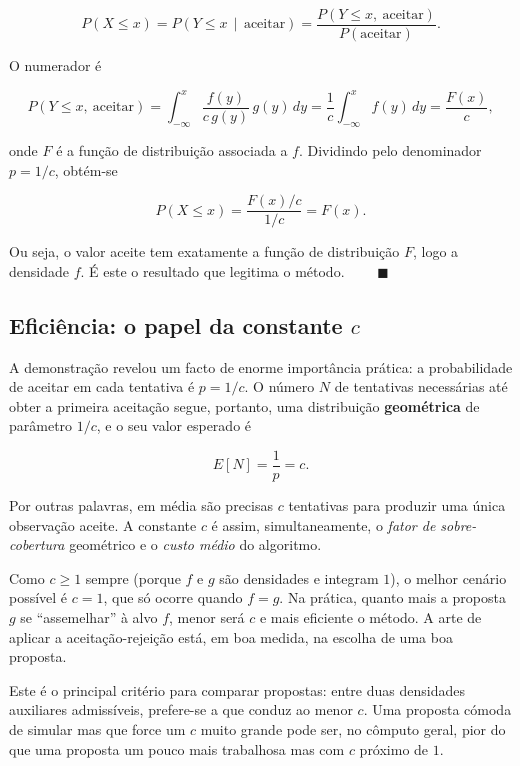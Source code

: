 \documentclass[
  portuguese,
  11pt,
  openany]{book}
\begin{document}
\[
P(X \leq x)
= P\!\left(Y \leq x \,\middle|\, \text{aceitar}\right)
= \frac{P(Y \leq x,\ \text{aceitar})}{P(\text{aceitar})}.
\]

O numerador é

\[
P(Y \leq x,\ \text{aceitar})
= \int_{-\infty}^{x} \frac{f(y)}{c\,g(y)}\, g(y)\, dy
= \frac{1}{c}\int_{-\infty}^{x} f(y)\, dy
= \frac{F(x)}{c},
\]

onde \(F\) é a função de distribuição associada a \(f\). Dividindo pelo
denominador \(p = 1/c\), obtém-se

\[
P(X \leq x) = \frac{F(x)/c}{1/c} = F(x).
\]

Ou seja, o valor aceite tem exatamente a função de distribuição \(F\), logo a
densidade \(f\). É este o resultado que legitima o método. \(\qquad\blacksquare\)

\subsection{\texorpdfstring{Eficiência: o papel da constante \(c\)}{Eficiência: o papel da constante c}}\label{eficiuxeancia-o-papel-da-constante-c}

A demonstração revelou um facto de enorme importância prática: a probabilidade
de aceitar em cada tentativa é \(p = 1/c\). O número \(N\) de tentativas necessárias
até obter a primeira aceitação segue, portanto, uma distribuição \textbf{geométrica}
de parâmetro \(1/c\), e o seu valor esperado é

\[
E[N] = \frac{1}{p} = c.
\]

Por outras palavras, em média são precisas \(c\) tentativas para produzir uma
única observação aceite. A constante \(c\) é assim, simultaneamente, o \emph{fator de
sobre-cobertura} geométrico e o \emph{custo médio} do algoritmo.

Como \(c \geq 1\) sempre (porque \(f\) e \(g\) são densidades e integram \(1\)), o
melhor cenário possível é \(c = 1\), que só ocorre quando \(f = g\). Na prática,
quanto mais a proposta \(g\) se ``assemelhar'' à alvo \(f\), menor será \(c\) e mais
eficiente o método. A arte de aplicar a aceitação-rejeição está, em boa medida,
na escolha de uma boa proposta.

Este é o principal critério para comparar propostas: entre duas densidades
auxiliares admissíveis, prefere-se a que conduz ao menor \(c\). Uma proposta
cómoda de simular mas que force um \(c\) muito grande pode ser, no cômputo geral,
pior do que uma proposta um pouco mais trabalhosa mas com \(c\) próximo de \(1\).
\end{document}
